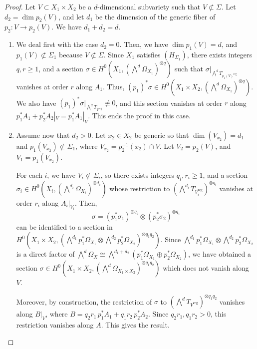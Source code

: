 \documentclass[JEP,XML,SOM,Unicode, NoEqCountersInSection,NoFloatCountersInSection,published]{cedram}
\newcommand{\reg}{\mathrm{reg}}
\theoremstyle{theorem}
\theoremstyle{definition}
\begin{document}
\begin{proof}
Let $V \subset X_1 \times X_2$ be a $d$-dimensional subvariety such that $V \not\subset \Sigma$. Let $d_2 = \dim p_2 (V)$, and let $d_1$ be the dimension of the generic fiber of $p_2 : V \to p_2(V)$. We have $d_1 + d_2 = d$.

\begin{enumerate}
\item
We deal first with the case $d_2 = 0$. Then, we have $\dim p_1(V) = d$, and $p_1(V) \not\subset \Sigma_1$ because $V \not\subset \Sigma$. Since $X_1$ satisfies $(H_{\Sigma_1})$, there exists integers $q, r \geq 1$, and a section $\sigma \in H^0(X_1, (\bigwedge^d \Omega_{X_1})^{\otimes q})$ such that $\sigma|_{\bigwedge^d T_{p_1(V)^{\reg}}}$ vanishes at order $r$ along $A_1$. Thus, $(p_1)^\ast \sigma \in H^0(X_1 \times X_2, (\bigwedge^d \Omega_{X_1})^{\otimes q})$. We also have $(p_1)^\ast \sigma|_{\bigwedge^d T_{V^{\reg}}} \not\equiv 0$, and this section vanishes at order $r$ along $p_1^\ast A_1 + p_2^\ast A_2|_{V} = p_1^\ast A_1|_{V} $. This ends the proof in this case.
\vspace{1em}

\item
Assume now that $d_2 > 0$. Let $x_2 \in X_2$ be generic so that $\dim (V_{x_2}) = d_1$ and $p_1 (V_{x_2}) \not\subset \Sigma_1$, where $V_{x_2} = p_2^{-1}(x_2) \cap V$. Let $V_2 = p_2(V)$, and $V_1 = p_1(V_{x_2})$.

For each $i$, we have $V_i \not\subset \Sigma_i$, so there exists integers $q_i, r_i \geq 1$, and a section $\sigma_i \in H^0( X_i, (\bigwedge^{d_i} \Omega_{X_i})^{\otimes d_i})$ whose restriction to $(\bigwedge^{d_i} T_{V_i^{\reg}})^{\otimes q_i}$ vanishes at order $r_i$ along $A_i|_{V_i}$. Then,
\[
\sigma = (p_1^\ast \sigma_1)^{\otimes q_2} \otimes (p_2^\ast \sigma_2)^{\otimes q_1}
\]
can be identified to a section in $H^0(X_1 \times X_2, ( \bigwedge^{d_1} p_1^\ast \Omega_{X_1} \otimes \bigwedge^{d_2} p_2^\ast \Omega_{X_2})^{\otimes q_1 q_2})$. Since $\bigwedge^{d_1} p_1^\ast \Omega_{X_1} \otimes \bigwedge^{d_2} p_2^\ast \Omega_{X_2}$ is a direct factor of $\bigwedge^{d} \Omega_X \cong \bigwedge^{d_1 + d_2} ( p_1^\ast \Omega_{X_1} \oplus p_2^\ast \Omega_{X_2})$, we have obtained a section $\sigma \!\in\!H^0(X_1 \times X_2, (\bigwedge^d \Omega_{X_1 \times X_2} )^{\otimes q_1 q_2})$ which does not vanish along~$V$.

Moreover, by construction, the restriction of $\sigma$ to $(\bigwedge^d T_{V^{\reg}})^{\otimes q_1 q_2}$ vanishes along $B|_{V}$, where $B = q_2 r_1 \, p_1^\ast A_1 + q_1 r_2\, p_2^\ast A_2$. Since $q_2 r_1, q_1 r_2 > 0$, this restriction vanishes along $A$. This gives the result.\qedhere
\end{enumerate}
\end{proof}
\end{document}
